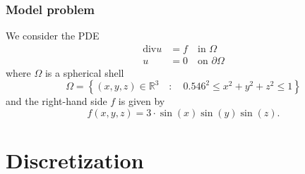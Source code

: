 \documentclass[t,compress=false,usepdftitle=false]{beamer}
\renewcommand{\div}{\mbox{div}}
\def\RR{\mathbb{R}}
\begin{document}
%
%
\begin{frame}\frametitle{Model problem}
We consider the PDE 
\begin{align*}
\div u &= f\quad \text{in }\Omega \\
     u &= 0\quad \text{on }\partial\Omega
\end{align*}
where $\Omega$ is a spherical shell
\begin{equation*}
\Omega = \left\{(x,y,z) \in\RR^3\quad:\quad 0.546^2 \leq x^2+y^2+z^2 \leq 1\right\}
\end{equation*}
and the right-hand side $f$ is given by
\begin{equation*}
f(x,y,z) = 3\cdot \sin(x)\sin(y)\sin(z).
\end{equation*}
%
\end{frame}
%
%
%
\section{Discretization}
\end{document}
